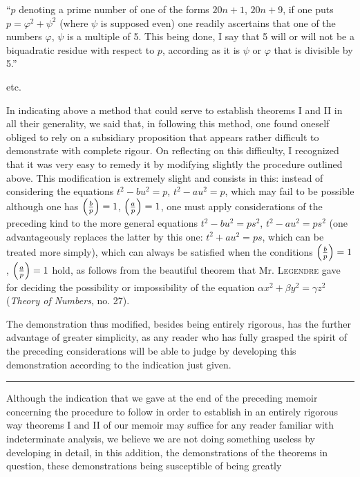 \par\indent
“$p$ denoting a prime number of one of the forms $20n+1$, $20n+9$,
if one puts $p=\varphi^2+\psi^2$ (where $\psi$ is supposed even) one readily ascertains that one
of the numbers $\varphi$, $\psi$ is a multiple of 5. This being done, I say that 5 will or will
not be a biquadratic residue with respect to $p$, according as it is $\psi$ or $\varphi$ that is
divisible by 5.”
\par\indent
etc.
\par\indent
In indicating above a method that could serve to establish
theorems I and II in all their generality, we said that, in following this
method, one found oneself obliged to rely on a subsidiary
proposition that appears rather difficult to demonstrate with complete rigour. On
reflecting on this difficulty, I recognized that it was very easy to remedy it by
modifying slightly the procedure outlined above. This modification is
extremely slight and consists in this: instead of considering the equations $t^2-bu^2=p$,
$t^2-au^2=p$, which may fail to be possible although one has $\left(\frac{b}{p}\right)=1$, $\left(\frac{a}{p}\right)=1$,
one must apply considerations of the preceding kind to the more general equations
$t^2-bu^2=ps^2$, $t^2-au^2=ps^2$ (one advantageously replaces the latter
by this one: $t^2+au^2=ps$, which can be treated more simply), which
can always be satisfied when the conditions $\left(\frac{b}{p}\right)=1$, $\left(\frac{a}{p}\right)=1$ hold,
as follows from the beautiful theorem that Mr. \textsc{Legendre} gave for deciding
the possibility or impossibility of the equation $\alpha x^2+\beta y^2=\gamma z^2$ (\emph{Theory of
Numbers}, no. 27).
\par\indent
The demonstration thus modified, besides being entirely rigorous,
has the further advantage of greater simplicity, as any reader who has fully
grasped the spirit of the preceding considerations will be able to judge by developing
this demonstration according to the indication just given.
\par\vspace{8pt}{\centering\rule{38mm}{0.3pt}\par}\vspace{4pt}
{\centering\rule{15mm}{0.3pt}\par}\vspace{4pt}
\par\indent
Although the indication that we gave at the end of the preceding
memoir concerning the procedure to follow in order to establish in an entirely
rigorous way theorems I and II of our memoir may suffice for any reader
familiar with indeterminate analysis, we believe we are not doing something
useless by developing in detail, in this addition, the demonstrations of the
theorems in question, these demonstrations being susceptible of being greatly
